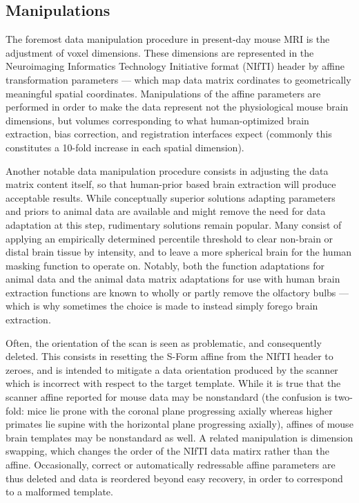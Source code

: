\subsection{Manipulations}
The foremost data manipulation procedure in present-day mouse MRI is the adjustment of voxel dimensions.
These dimensions are represented in the Neuroimaging Informatics Technology Initiative format (NIfTI) header \cite{nifti} by affine transformation parameters --- which map data matrix cordinates to geometrically meaningful spatial coordinates.
Manipulations of the affine parameters are performed in order to make the data represent not the physiological mouse brain dimensions, but volumes corresponding to what human-optimized brain extraction, bias correction, and registration interfaces expect (commonly this constitutes a 10-fold increase in each spatial dimension).

Another notable data manipulation procedure consists in adjusting the data matrix content itself, so that human-prior based brain extraction will produce acceptable results.
While conceptually superior solutions adapting parameters and priors to animal data are available \cite{rbet,Oguz2014} and might remove the need for data adaptation at this step, rudimentary solutions remain popular.
Many consist of applying an empirically determined percentile threshold to clear non-brain or distal brain tissue by intensity, and to leave a more spherical brain for the human masking function to operate on.
Notably, both the function adaptations for animal data and the animal data matrix adaptations for use with human brain extraction functions are known to wholly or partly remove the olfactory bulbs --- which is why sometimes the choice is made to instead simply forego brain extraction.

Often, the orientation of the scan is seen as problematic, and consequently deleted.
This consists in resetting the S-Form affine from the NIfTI header to zeroes, and is intended to mitigate a data orientation produced by the scanner which is incorrect with respect to the target template.
While it is true that the scanner affine reported for mouse data may be nonstandard (the confusion is two-fold: mice lie prone with the coronal plane progressing axially whereas higher primates lie supine with the horizontal plane progressing axially), affines of mouse brain templates may be nonstandard as well.
A related manipulation is dimension swapping, which changes the order of the NIfTI data matirx rather than the affine.
Occasionally, correct or automatically redressable affine parameters are thus deleted and data is reordered beyond easy recovery, in order to correspond to a malformed template.

